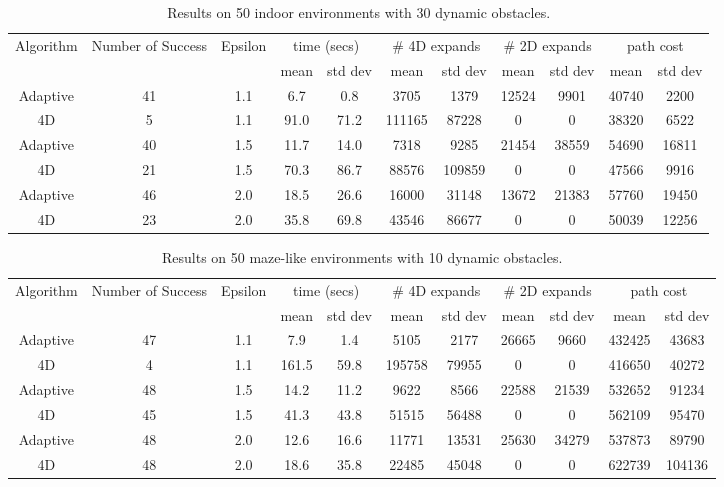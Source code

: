 \begin{table}[t]
\scriptsize
\centering

\begin{tabular}{|c|c|c|c c|c c|c c|c c|}
\hline
Algorithm & Number of Success & Epsilon & \multicolumn{2}{|c|}{time (secs)} & \multicolumn{2}{|c|}{\# 4D expands} & \multicolumn{2}{|c|}{\# 2D expands} & \multicolumn{2}{|c|}{path cost} \\ 
 & & & mean & std dev & mean & std dev & mean & std dev & mean  & std dev \\ \hline\hline
Adaptive & 41 & 1.1 & 6.7 & 0.8 & 3705 & 1379 & 12524 & 9901 & 40740 & 2200 \\
\hline
4D & 5 & 1.1 & 91.0 & 71.2 & 111165 & 87228 & 0 & 0 & 38320 & 6522 \\
\hline\hline
Adaptive & 40 & 1.5 & 11.7 & 14.0 & 7318 & 9285 & 21454 & 38559 & 54690 & 16811 \\
\hline
4D & 21 & 1.5 & 70.3 & 86.7 & 88576 & 109859 & 0 & 0 & 47566 & 9916 \\
\hline\hline
Adaptive & 46 & 2.0 & 18.5 & 26.6 & 16000 & 31148 & 13672 & 21383 & 57760 & 19450 \\
\hline
4D & 23 & 2.0 & 35.8 & 69.8 & 43546 & 86677 & 0 & 0 & 50039 & 12256 \\
\hline
\end{tabular}

\caption{Results on 50 indoor environments with 30 dynamic obstacles.}
\label{tab:indoor-30}
\end{table}

\begin{table}[t]
\scriptsize
\centering

\begin{tabular}{|c|c|c|c c|c c|c c|c c|}
\hline
Algorithm & Number of Success & Epsilon & \multicolumn{2}{|c|}{time (secs)} & \multicolumn{2}{|c|}{\# 4D expands} & \multicolumn{2}{|c|}{\# 2D expands} & \multicolumn{2}{|c|}{path cost} \\ 
 & & & mean & std dev & mean & std dev & mean & std dev & mean  & std dev \\ \hline\hline
Adaptive & 47 & 1.1 & 7.9 & 1.4 & 5105 & 2177 & 26665 & 9660 & 432425 & 43683 \\
\hline
4D & 4 & 1.1 & 161.5 & 59.8 & 195758 & 79955 & 0 & 0 & 416650 & 40272 \\
\hline\hline
Adaptive & 48 & 1.5 & 14.2 & 11.2 & 9622 & 8566 & 22588 & 21539 & 532652 & 91234 \\
\hline
4D & 45 & 1.5 & 41.3 & 43.8 & 51515 & 56488 & 0 & 0 & 562109 & 95470 \\
\hline\hline
Adaptive & 48 & 2.0 & 12.6 & 16.6 & 11771 & 13531 & 25630 & 34279 & 537873 & 89790 \\
\hline
4D & 48 & 2.0 & 18.6 & 35.8 & 22485 & 45048 & 0 & 0 & 622739 & 104136 \\
\hline
\end{tabular}

\caption{Results on 50 maze-like environments with 10 dynamic obstacles.}
\label{tab:maze-10}
\end{table}

